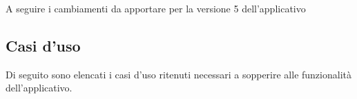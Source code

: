 A seguire i cambiamenti da apportare per la versione 5 dell'applicativo

\subsection{Casi d'uso}
Di seguito sono elencati i casi d'uso ritenuti necessari a sopperire alle funzionalità
dell'applicativo.
\\\\


\pagebreak
